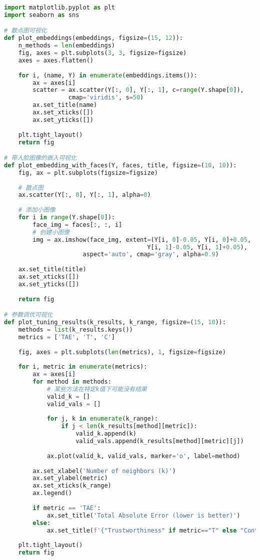 \documentclass{article}
\begin{document}
\begin{lstlisting}[language=Python]
import matplotlib.pyplot as plt
import seaborn as sns

# 散点图可视化
def plot_embeddings(embeddings, figsize=(15, 12)):
    n_methods = len(embeddings)
    fig, axes = plt.subplots(3, 3, figsize=figsize)
    axes = axes.flatten()
    
    for i, (name, Y) in enumerate(embeddings.items()):
        ax = axes[i]
        scatter = ax.scatter(Y[:, 0], Y[:, 1], c=range(Y.shape[0]), 
                  cmap='viridis', s=50)
        ax.set_title(name)
        ax.set_xticks([])
        ax.set_yticks([])
    
    plt.tight_layout()
    return fig

# 带人脸图像的嵌入可视化
def plot_embedding_with_faces(Y, faces, title, figsize=(10, 10)):
    fig, ax = plt.subplots(figsize=figsize)
    
    # 散点图
    ax.scatter(Y[:, 0], Y[:, 1], alpha=0)
    
    # 添加小图像
    for i in range(Y.shape[0]):
        face_img = faces[:, :, i]
        # 创建小图像
        img = ax.imshow(face_img, extent=(Y[i, 0]-0.05, Y[i, 0]+0.05, 
                                        Y[i, 1]-0.05, Y[i, 1]+0.05),
                      aspect='auto', cmap='gray', alpha=0.9)
    
    ax.set_title(title)
    ax.set_xticks([])
    ax.set_yticks([])
    
    return fig

# 参数调优可视化
def plot_tuning_results(k_results, k_range, figsize=(15, 10)):
    methods = list(k_results.keys())
    metrics = ['TAE', 'T', 'C']
    
    fig, axes = plt.subplots(len(metrics), 1, figsize=figsize)
    
    for i, metric in enumerate(metrics):
        ax = axes[i]
        for method in methods:
            # 某些方法在特定k值下可能没有结果
            valid_k = []
            valid_vals = []
            
            for j, k in enumerate(k_range):
                if j < len(k_results[method][metric]):
                    valid_k.append(k)
                    valid_vals.append(k_results[method][metric][j])
            
            ax.plot(valid_k, valid_vals, marker='o', label=method)
        
        ax.set_xlabel('Number of neighbors (k)')
        ax.set_ylabel(metric)
        ax.set_xticks(k_range)
        ax.legend()
        
        if metric == 'TAE':
            ax.set_title('Total Absolute Error (lower is better)')
        else:
            ax.set_title(f'{"Trustworthiness" if metric=="T" else "Continuity"} (higher is better)')
    
    plt.tight_layout()
    return fig
\end{lstlisting}
\end{document}
